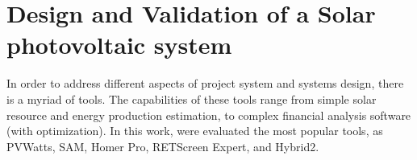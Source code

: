 \documentclass[journal]{IEEEtran}
\begin{document}



\section{Design and Validation of a Solar photovoltaic system}
%
In order to address different aspects of project system and systems design, there is a myriad of tools. 
The capabilities of these tools range from simple solar resource and energy production estimation, %
 to complex financial analysis software (with optimization). 
%
In this work, were evaluated the most popular tools, as PVWatts, SAM, Homer Pro, RETScreen Expert, and Hybrid2.
\end{document}
